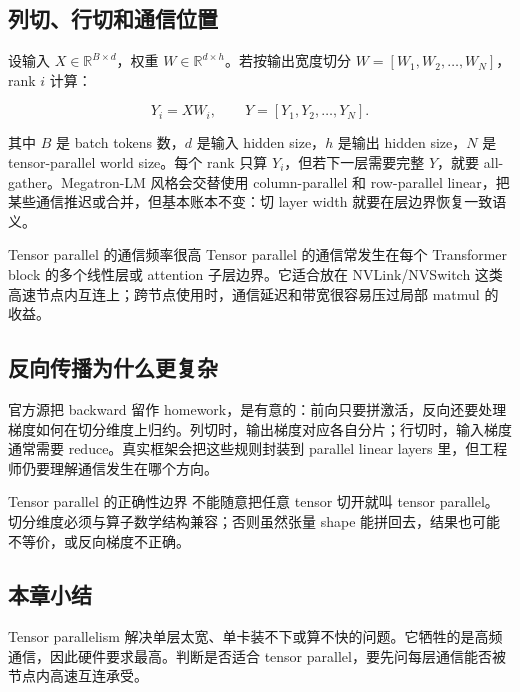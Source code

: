 \subsection{列切、行切和通信位置}

设输入 \(X\in\mathbb{R}^{B\times d}\)，权重 \(W\in\mathbb{R}^{d\times h}\)。若按输出宽度切分 \(W=[W_1,W_2,\dots,W_N]\)，rank \(i\) 计算：

\[
Y_i = X W_i,\qquad
Y = [Y_1,Y_2,\dots,Y_N].
\]

其中 \(B\) 是 batch tokens 数，\(d\) 是输入 hidden size，\(h\) 是输出 hidden size，\(N\) 是 tensor-parallel world size。每个 rank 只算 \(Y_i\)，但若下一层需要完整 \(Y\)，就要 all-gather。Megatron-LM 风格会交替使用 column-parallel 和 row-parallel linear，把某些通信推迟或合并，但基本账本不变：切 layer width 就要在层边界恢复一致语义。

\begin{importantbox}{Tensor parallel 的通信频率很高}
Tensor parallel 的通信常发生在每个 Transformer block 的多个线性层或 attention 子层边界。它适合放在 NVLink/NVSwitch 这类高速节点内互连上；跨节点使用时，通信延迟和带宽很容易压过局部 matmul 的收益。
\end{importantbox}

\subsection{反向传播为什么更复杂}

官方源把 backward 留作 homework，是有意的：前向只要拼激活，反向还要处理梯度如何在切分维度上归约。列切时，输出梯度对应各自分片；行切时，输入梯度通常需要 reduce。真实框架会把这些规则封装到 parallel linear layers 里，但工程师仍要理解通信发生在哪个方向。

\begin{warningbox}{Tensor parallel 的正确性边界}
不能随意把任意 tensor 切开就叫 tensor parallel。切分维度必须与算子数学结构兼容；否则虽然张量 shape 能拼回去，结果也可能不等价，或反向梯度不正确。
\end{warningbox}

\subsection{本章小结}

Tensor parallelism 解决单层太宽、单卡装不下或算不快的问题。它牺牲的是高频通信，因此硬件要求最高。判断是否适合 tensor parallel，要先问每层通信能否被节点内高速互连承受。

